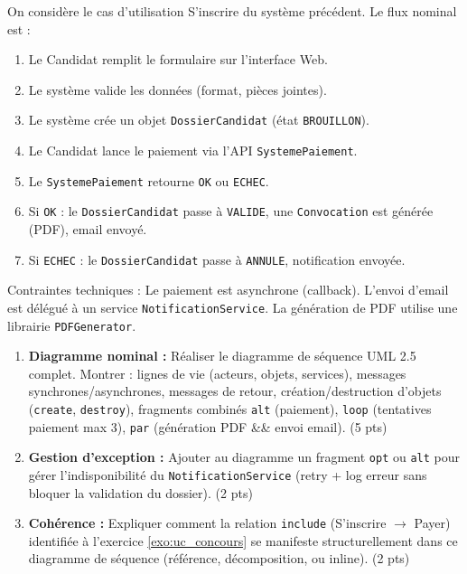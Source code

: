\documentclass[11pt]{article}
\begin{document}
\begin{exercice}
\label{exo:seq_inscription}
On considère le cas d'utilisation \og{}S'inscrire\fg{} du système précédent. Le flux nominal est :
\begin{enumerate}
    \item Le Candidat remplit le formulaire sur l'interface Web.
    \item Le système valide les données (format, pièces jointes).
    \item Le système crée un objet \texttt{DossierCandidat} (état \texttt{BROUILLON}).
    \item Le Candidat lance le paiement via l'API \texttt{SystemePaiement}.
    \item Le \texttt{SystemePaiement} retourne \texttt{OK} ou \texttt{ECHEC}.
    \item Si \texttt{OK} : le \texttt{DossierCandidat} passe à \texttt{VALIDE}, une \texttt{Convocation} est générée (PDF), email envoyé.
    \item Si \texttt{ECHEC} : le \texttt{DossierCandidat} passe à \texttt{ANNULE}, notification envoyée.
\end{enumerate}
Contraintes techniques : Le paiement est asynchrone (callback). L'envoi d'email est délégué à un service \texttt{NotificationService}. La génération de PDF utilise une librairie \texttt{PDFGenerator}.

\begin{enumerate}
    \item \textbf{Diagramme nominal :} Réaliser le diagramme de séquence UML 2.5 complet. Montrer : lignes de vie (acteurs, objets, services), messages synchrones/asynchrones, messages de retour, création/destruction d'objets (\texttt{create}, \texttt{destroy}), fragments combinés \texttt{alt} (paiement), \texttt{loop} (tentatives paiement max 3), \texttt{par} (génération PDF \&\& envoi email). (5 pts)
    \item \textbf{Gestion d'exception :} Ajouter au diagramme un fragment \texttt{opt} ou \texttt{alt} pour gérer l'indisponibilité du \texttt{NotificationService} (retry + log erreur sans bloquer la validation du dossier). (2 pts)
    \item \textbf{Cohérence :} Expliquer comment la relation \texttt{include} (\og{}S'inscrire\fg{} $\rightarrow$ \og{}Payer\fg{}) identifiée à l'exercice \ref{exo:uc_concours} se manifeste structurellement dans ce diagramme de séquence (référence, décomposition, ou inline). (2 pts)
\end{enumerate}
\end{exercice}
\end{document}
